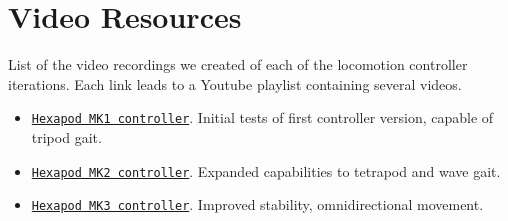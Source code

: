 \chapter*{Video Resources}

List of the video recordings we created of each of the locomotion controller iterations.
Each link leads to a Youtube playlist containing several videos.

\begin{itemize} 
	\item \href{https://www.youtube.com/playlist?list=PLS4sTWHhl8ch8N8BN3j6T0ZQ_9AVyyJ_g}{\texttt{Hexapod MK1 controller}}. Initial tests of first controller version, capable of tripod gait. \label{vid: MK1}
	
	\item \href{https://www.youtube.com/playlist?list=PLS4sTWHhl8cj9ypZECQ52zXKAU14XlxXN}{\texttt{Hexapod MK2 controller}}. Expanded capabilities to tetrapod and wave gait. \label{vid: MK2}
	
	\item \href{https://www.youtube.com/playlist?list=PLS4sTWHhl8ch6pUkxzVL7x9Dk8ctq-gox}{\texttt{Hexapod MK3 controller}}. Improved stability, omnidirectional movement. \label{vid: MK3}
\end{itemize}